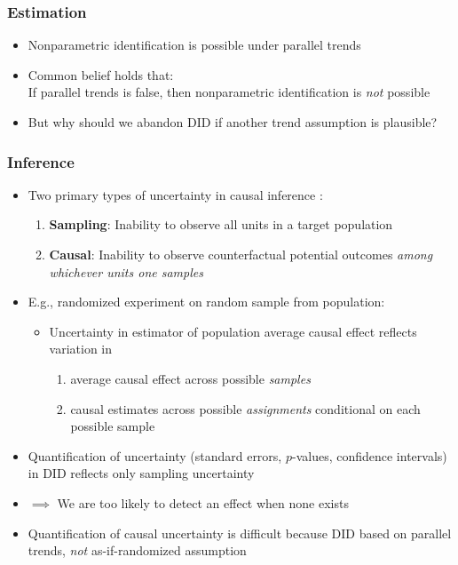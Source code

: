 \documentclass[table, xcolor = {dvipsnames}, 9pt]{beamer}
\theoremstyle{plain}
\begin{document}
\begin{frame}[t]
\frametitle{Estimation}
\vfill
\begin{itemize} \vfill
\item Nonparametric identification is possible under parallel trends \vfill
\item Common belief holds that: \\ If parallel trends is false, then nonparametric identification is \textit{not} possible \vfill
\item But why should we abandon DID if another trend assumption is plausible? \vfill
\end{itemize}
\vfill
\end{frame}
\begin{frame}[t]
\frametitle{Inference}
\vfill 
\begin{itemize}
\item Two primary types of uncertainty in causal inference \citep{abadieetal2020}: \vfill
\begin{enumerate}
\item \textbf{Sampling}: Inability to observe all units in a target population \vfill
\item \textbf{Causal}: Inability to observe counterfactual potential outcomes \textit{among whichever units one samples}  \vfill
\end{enumerate}
\item E.g., randomized experiment on random sample from population: \vfill
\begin{itemize}
\item Uncertainty in estimator of population average causal effect reflects variation in \vfill
\begin{enumerate}
\item average causal effect across possible \textit{samples} \vfill
\item causal estimates across possible \textit{assignments} conditional on each possible sample \vfill
\end{enumerate} 
\end{itemize}
\item Quantification of uncertainty (standard errors, $p$-values, confidence intervals) in DID reflects only sampling uncertainty \vfill
\item[] $\implies$ We are too likely to detect an effect when none exists \vfill
\item Quantification of causal uncertainty is difficult because DID based on parallel trends, \textit{not} as-if-randomized assumption \\ 
\citep{manskipepper2018} \vfill
\end{itemize}
\vfill
\end{frame}
\end{document}
